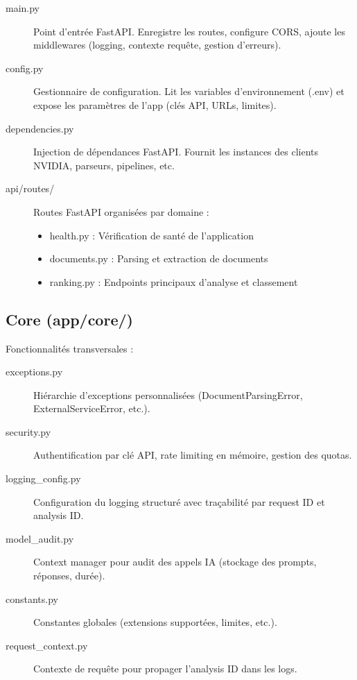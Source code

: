 \documentclass[12pt,a4paper,oneside]{book}
\begin{document}
\begin{description}
    \item[main.py] Point d'entrée FastAPI. Enregistre les routes, configure CORS, ajoute les middlewares (logging, contexte requête, gestion d'erreurs).
    
    \item[config.py] Gestionnaire de configuration. Lit les variables d'environnement (.env) et expose les paramètres de l'app (clés API, URLs, limites).
    
    \item[dependencies.py] Injection de dépendances FastAPI. Fournit les instances des clients NVIDIA, parseurs, pipelines, etc.
    
    \item[api/routes/] Routes FastAPI organisées par domaine :
    \begin{itemize}
        \item health.py : Vérification de santé de l'application
        \item documents.py : Parsing et extraction de documents
        \item ranking.py : Endpoints principaux d'analyse et classement
    \end{itemize}
\end{description}

\subsection{Core (app/core/)}

Fonctionnalités transversales :

\begin{description}
    \item[exceptions.py] Hiérarchie d'exceptions personnalisées (DocumentParsingError, ExternalServiceError, etc.).
    
    \item[security.py] Authentification par clé API, rate limiting en mémoire, gestion des quotas.
    
    \item[logging\_config.py] Configuration du logging structuré avec traçabilité par request ID et analysis ID.
    
    \item[model\_audit.py] Context manager pour audit des appels IA (stockage des prompts, réponses, durée).
    
    \item[constants.py] Constantes globales (extensions supportées, limites, etc.).
    
    \item[request\_context.py] Contexte de requête pour propager l'analysis ID dans les logs.
\end{description}
\end{document}
